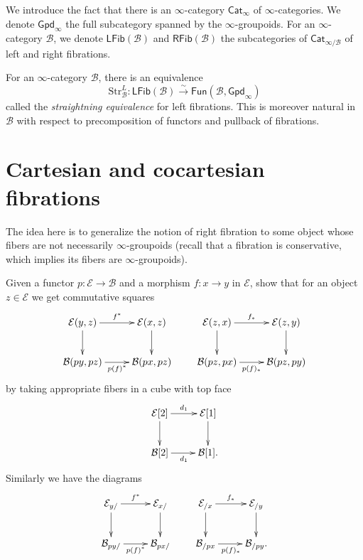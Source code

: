 \medskip\noindent
We introduce the fact that there is an $\infty$-category $\mathsf{Cat}_\infty$
of $\infty$-categories. We denote $\mathsf{Gpd}_\infty$ 
the full subcategory spanned by the $\infty$-groupoids.
For an $\infty$-category $\mathcal{B}$,
we denote $\mathsf{LFib}(\mathcal{B})$ and $\mathsf{RFib}(\mathcal{B})$
the subcategories of $\mathsf{Cat}_{\infty/\mathcal{B}}$
of left and right fibrations.

\begin{theorem}[Lurie]
\label{theorem-lurie}
For an $\infty$-category $\mathcal{B}$, there is an equivalence
$$
\text{Str}_{\mathcal{B}}^L:\mathsf{LFib}(\mathcal{B})
\overset{\sim}{\to}\mathsf{Fun}(\mathcal{B},\mathsf{Gpd}_\infty)
$$
called the {\it straightning equivalence} for left fibrations.
This is moreover natural in $\mathcal{B}$ with respect
to precomposition of functors and pullback of fibrations.
\end{theorem}

\section{Cartesian and cocartesian fibrations}
\label{section-cartesian-fibrations}

\noindent
The idea here is to generalize the notion of right fibration
to some object whose fibers are not necessarily $\infty$-groupoids
(recall that a fibration is conservative, which implies its fibers
are $\infty$-groupoids).

\begin{exercise}
\label{exercise-3.5}
Given a functor  $p: \mathcal{E} \to \mathcal{B}$ and a morphism
$f: x \to y$ in $\mathcal{E}$, show that for an object
$z \in \mathcal{E}$ we get commutative squares
$$
\xymatrix{
\mathcal{E}(y,z)\ar[r]^{f^*}\ar[d]&\mathcal{E}(x,z)\ar[d]\\
\mathcal{B}(py,pz)\ar[r]_{p(f)^*}&\mathcal{B}(px,pz)
}
\qquad 
\xymatrix{
\mathcal{E}(z,x)\ar[r]^{f_*}\ar[d]&\mathcal{E}(z,y)\ar[d]\\
\mathcal{B}(pz,px)\ar[r]_{p(f)_*}&\mathcal{B}(pz,py)
}
$$
by taking appropriate fibers in a cube with top face
$$
\xymatrix{
\mathcal{E}[2]\ar[r]^{d_1}\ar[d]&\mathcal{E}[1]\ar[d]\\
\mathcal{B}[2]\ar[r]_{d_1}&\mathcal{B}[1].
}
$$
Similarly we have the diagrams
$$
\xymatrix{
\mathcal{E}_{y/}\ar[r]^{f^*}\ar[d]&\mathcal{E}_{x/}\ar[d]\\
\mathcal{B}_{py/}\ar[r]_{p(f)^*}&\mathcal{B}_{px/}
}\qquad 
\xymatrix{
\mathcal{E}_{/x}\ar[r]^{f_*}\ar[d]&\mathcal{E}_{/y}\ar[d]\\
\mathcal{B}_{/px}\ar[r]_{p(f)_*}&\mathcal{B}_{/py}.
}
$$
\end{exercise}

